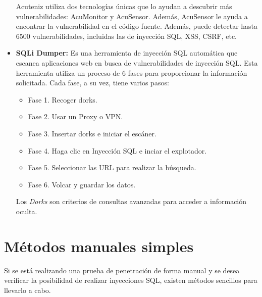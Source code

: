 \documentclass[11pt]{report}
\begin{document}
\begin{itemize}
  Acuteniz utiliza dos tecnologías únicas que lo ayudan a descubrir más vulnerabilidades: AcuMonitor y AcuSensor. Además, AcuSensor
  le ayuda a encontrar la vulnerabilidad en el código fuente. Además, puede detectar hasta 6500 vulnerabilidades, incluidas las de
  inyección SQL, XSS, CSRF, etc.

  \item \textbf{SQLi Dumper:} Es una herramienta de inyección SQL automática que escanea aplicaciones web en busca de vulnerabilidades de inyección SQL.
  Esta herramienta utiliza un proceso de 6 fases para proporcionar la información solicitada. Cada fase, a su vez, tiene varios pasos:
  \begin{itemize}
    \item Fase 1. Recoger dorks.
    \item Fase 2. Usar un Proxy o VPN.
    \item Fase 3. Insertar dorks e iniciar el escáner.
    \item Fase 4. Haga clic en Inyección SQL e inciar el explotador.
    \item Fase 5. Seleccionar las URL para realizar la búsqueda.
    \item Fase 6. Volcar y guardar los datos.
  \end{itemize}

  Los \emph{Dorks} son criterios de consultas avanzadas para acceder a información oculta.
\end{itemize}


\section{Métodos manuales simples}
Si se está realizando una prueba de penetración de forma manual y se desea verificar la posibilidad de realizar inyecciones SQL,
existen métodos sencillos para llevarlo a cabo.
\end{document}

